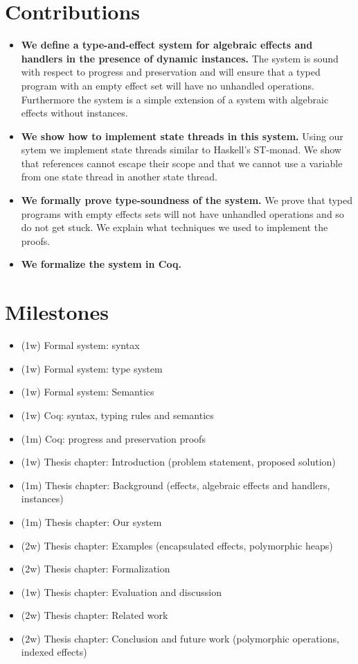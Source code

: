 \documentclass[12pt]{article}
\begin{document}
\section{Contributions}
\begin{itemize}

\item \textbf{We define a type-and-effect system for algebraic effects and handlers in the presence of dynamic instances.}
The system is sound with respect to progress and preservation and will ensure that a typed program with an empty effect set will have no unhandled operations.
Furthermore the system is a simple extension of a system with algebraic effects without instances.

\item \textbf{We show how to implement state threads in this system.}
Using our sytem we implement state threads similar to Haskell's ST-monad.
We show that references cannot escape their scope and that we cannot use a variable from one state thread in another state thread.

\item \textbf{We formally prove type-soundness of the system.}
We prove that typed programs with empty effects sets will not have unhandled operations and so do not get stuck.
We explain what techniques we used to implement the proofs.

\item \textbf{We formalize the system in Coq.}

\end{itemize}

\section{Milestones}
\begin{itemize}
\item (1w) Formal system: syntax
\item (1w) Formal system: type system
\item (1w) Formal system: Semantics
\item (1w) Coq: syntax, typing rules and semantics
\item (1m) Coq: progress and preservation proofs
\item (1w) Thesis chapter: Introduction (problem statement, proposed solution)
\item (1m) Thesis chapter: Background (effects, algebraic effects and handlers, instances)
\item (1m) Thesis chapter: Our system
\item (2w) Thesis chapter: Examples (encapsulated effects, polymorphic heaps)
\item (2w) Thesis chapter: Formalization
\item (1w) Thesis chapter: Evaluation and discussion
\item (2w) Thesis chapter: Related work
\item (2w) Thesis chapter: Conclusion and future work (polymorphic operations, indexed effects)
\end{itemize}
\end{document}
